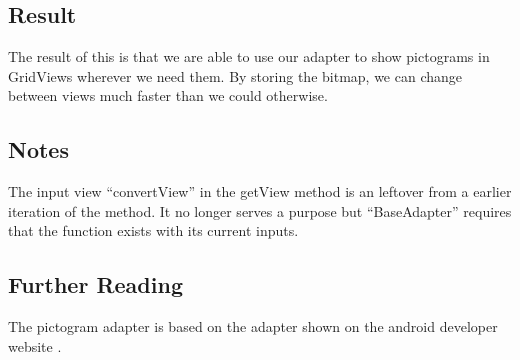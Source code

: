 \subsection*{Result}
The result of this is that we are able to use our adapter to show pictograms in GridViews wherever we need them.
By storing the bitmap, we can change between views much faster than we could otherwise.


\subsection*{Notes}
The input view ``convertView'' in the getView method is an leftover from a earlier iteration of the method. It no longer serves a purpose but ``BaseAdapter'' requires that the function exists with its current inputs.\\

\subsection*{Further Reading}

The pictogram adapter is based on the adapter shown on the android developer website \cite{gridview}.